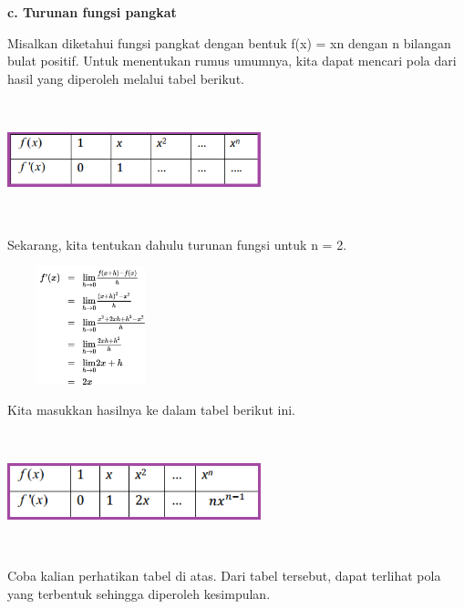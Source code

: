 \documentclass[11pt,fleqn]{book} %
\begin{document}
\noindent 
\noindent \textbf{c. Turunan fungsi pangkat}

\noindent 
Misalkan diketahui fungsi pangkat dengan bentuk f(x) = xn dengan n bilangan bulat positif. Untuk menentukan rumus umumnya, kita dapat mencari pola dari hasil yang diperoleh melalui tabel berikut.

\noindent 
\begin{center}
\includegraphics*[width=2.90in, height=1.35in]{Pictures/TurunanFungsi9.png}
\end{center}

\noindent 
Sekarang, kita tentukan dahulu turunan fungsi untuk n = 2.

\noindent 
\begin{center}
\includegraphics*[width=1.90in, height=1.35in]{Pictures/TurunanFungsi10.png}
\end{center}

\noindent 
Kita masukkan hasilnya ke dalam tabel berikut ini.

\noindent 
\begin{center}
\includegraphics*[width=2.90in, height=1.35in]{Pictures/TurunanFungsi11.png}
\end{center}

\noindent 
Coba kalian perhatikan tabel di atas. Dari tabel tersebut, dapat terlihat pola yang terbentuk sehingga diperoleh kesimpulan.\\
\end{document}
